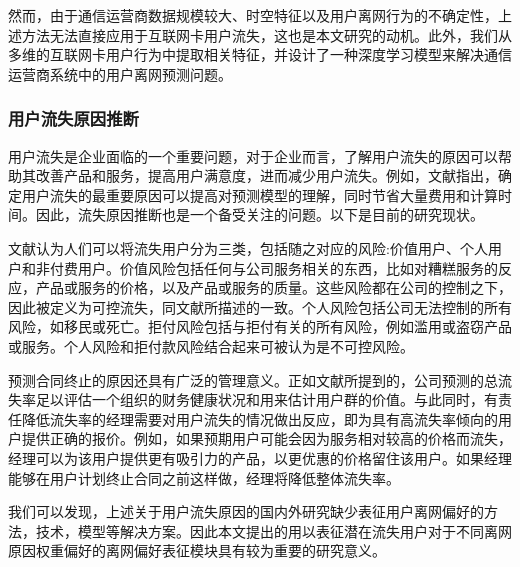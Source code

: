 然而，由于通信运营商数据规模较大、时空特征以及用户离网行为的不确定性，上述方法无法直接应用于互联网卡用户流失，这也是本文研究的动机。此外，我们从多维的互联网卡用户行为中提取相关特征，并设计了一种深度学习模型来解决通信运营商系统中的用户离网预测问题。


\subsubsection{用户流失原因推断}
用户流失是企业面临的一个重要问题，对于企业而言，了解用户流失的原因可以帮助其改善产品和服务，提高用户满意度，进而减少用户流失。例如，文献\cite{kim2006toward}指出，确定用户流失的最重要原因可以提高对预测模型的理解，同时节省大量费用和计算时间。因此，流失原因推断也是一个备受关注的问题。以下是目前的研究现状。\par
文献\cite{braun2011modeling}认为人们可以将流失用户分为三类，包括随之对应的风险:价值用户、个人用户和非付费用户。价值风险包括任何与公司服务相关的东西，比如对糟糕服务的反应，产品或服务的价格，以及产品或服务的质量。这些风险都在公司的控制之下，因此被定义为可控流失，同文献\cite{keaveney1995customer}所描述的一致。个人风险包括公司无法控制的所有风险，如移民或死亡。拒付风险包括与拒付有关的所有风险，例如滥用或盗窃产品或服务。个人风险和拒付款风险结合起来可被认为是不可控风险。\par
预测合同终止的原因还具有广泛的管理意义。正如文献\cite{fader2010customer, gupta2004valuing}所提到的，公司预测的总流失率足以评估一个组织的财务健康状况和用来估计用户群的价值。与此同时，有责任降低流失率的经理需要对用户流失的情况做出反应，即为具有高流失率倾向的用户提供正确的报价。例如，如果预期用户可能会因为服务相对较高的价格而流失，经理可以为该用户提供更有吸引力的产品，以更优惠的价格留住该用户。如果经理能够在用户计划终止合同之前这样做，经理将降低整体流失率。\par
我们可以发现，上述关于用户流失原因的国内外研究缺少表征用户离网偏好的方法，技术，模型等解决方案。因此本文提出的用以表征潜在流失用户对于不同离网原因权重偏好的离网偏好表征模块具有较为重要的研究意义。
\par


